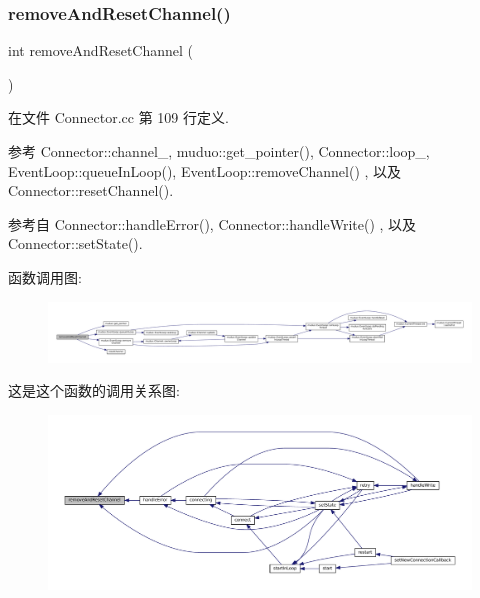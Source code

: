 \subsubsection{\texorpdfstring{remove\+And\+Reset\+Channel()}{removeAndResetChannel()}}
{\footnotesize\ttfamily int remove\+And\+Reset\+Channel (\begin{DoxyParamCaption}{ }\end{DoxyParamCaption})\hspace{0.3cm}{\ttfamily [private]}}



在文件 Connector.\+cc 第 109 行定义.



参考 Connector\+::channel\+\_\+, muduo\+::get\+\_\+pointer(), Connector\+::loop\+\_\+, Event\+Loop\+::queue\+In\+Loop(), Event\+Loop\+::remove\+Channel() , 以及 Connector\+::reset\+Channel().



参考自 Connector\+::handle\+Error(), Connector\+::handle\+Write() , 以及 Connector\+::set\+State().

函数调用图\+:
\nopagebreak
\begin{figure}[H]
\begin{center}
\leavevmode
\includegraphics[width=350pt]{classmuduo_1_1Connector_abf9772658904f185215158e0dbdf9610_cgraph}
\end{center}
\end{figure}
这是这个函数的调用关系图\+:
\nopagebreak
\begin{figure}[H]
\begin{center}
\leavevmode
\includegraphics[width=350pt]{classmuduo_1_1Connector_abf9772658904f185215158e0dbdf9610_icgraph}
\end{center}
\end{figure}
\mbox{\label{classmuduo_1_1Connector_aeb215fb4b2ea3598389e881b87a49631}} 
